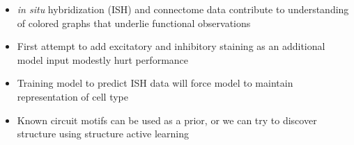 \begin{frame}{\aimThree}
  \textbf{\qThree}
  \begin{itemize}
    \item \emph{in situ} hybridization (ISH) and connectome data contribute to understanding of colored graphs that underlie functional observations
    \item First attempt to add excitatory and inhibitory staining as an additional model input modestly hurt performance
    \item Training model to predict ISH data will force model to maintain representation of cell type
    \item Known circuit motifs can be used as a prior, or we can try to discover structure using structure active learning
  \end{itemize}
\end{frame}
